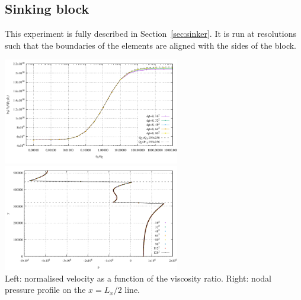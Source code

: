 \subsection*{Sinking block}

This experiment is fully described in Section~\ref{sec:sinker}.
It is run at resolutions such that the boundaries of the elements are aligned with the sides of the block.

\begin{center}
\includegraphics[width=7.7cm]{python_codes/fieldstone_80/results/block/results_v}
\includegraphics[width=7.7cm]{python_codes/fieldstone_80/results/block/pline}\\
{\captionfont Left: normalised velocity as a function of the viscosity ratio. Right: 
nodal pressure profile on the $x=L_x/2$ line.}
\end{center}


